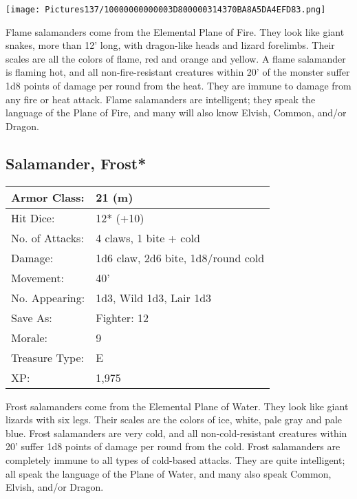 \documentclass[a4paper,twoside,openany,10pt]{book}
\begin{document}
\begin{multicols}{2}
\begin{center} \texttt{[image: Pictures137/10000000000003D800000314370BA8A5DA4EFD83.png]} \end{center}

Flame salamanders come from the Elemental Plane of Fire. They look like giant snakes, more than 12' long, with dragon-like heads and lizard forelimbs. Their scales are all the colors of flame, red and orange and yellow. A flame salamander is flaming hot, and all non-fire-resistant creatures within 20' of the monster suffer 1d8 points of damage per round from the heat. They are immune to damage from any fire or heat attack. Flame salamanders are intelligent; they speak the language of the Plane of Fire, and many will also know Elvish, Common, and/or Dragon.


\subsection*{Salamander, Frost*}\label{salamander-frost}

\begin{tabularx}{0.50\textwidth}{@{}lX@{}}
Armor Class: & 21 (m) \\\hline
Hit Dice: & 12* (+10) \\\hline
No. of Attacks: & 4 claws, 1 bite + cold \\\hline
Damage: & 1d6 claw, 2d6 bite, 1d8/round cold \\\hline
Movement: & 40' \\\hline
No. Appearing: & 1d3, Wild 1d3, Lair 1d3 \\\hline
Save As: & Fighter: 12 \\\hline
Morale: & 9 \\\hline
Treasure Type: & E \\\hline
XP: & 1,975 \\\hline
\end{tabularx}\medskip

Frost salamanders come from the Elemental Plane of Water. They look like giant lizards with six legs. Their scales are the colors of ice, white, pale gray and pale blue. Frost salamanders are very cold, and all non-cold-resistant creatures within 20' suffer 1d8 points of damage per round from the cold. Frost salamanders are completely immune to all types of cold-based attacks. They are quite intelligent; all speak the language of the Plane of Water, and many also speak Common, Elvish, and/or Dragon.


\end{multicols}
\end{document}
